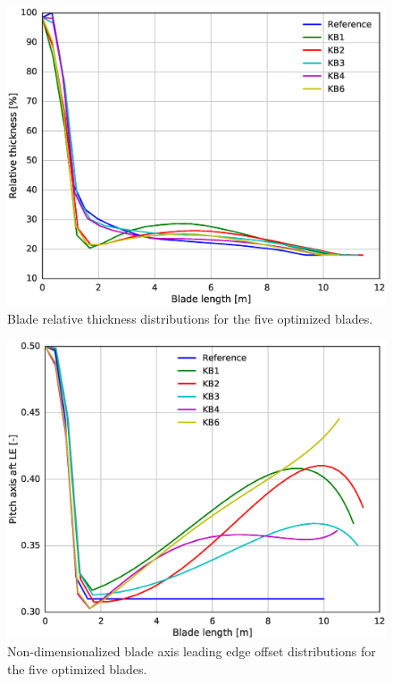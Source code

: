 \begin{figure}[!ht]
\begin{center}
	\includegraphics[width=.85\linewidth]{figures/KBcomp_rthick.eps}
\end{center}
\caption{Blade relative thickness distributions for the five optimized blades.}
\label{fig:rthick}
\end{figure}


\begin{figure}[!ht]
\begin{center}
	\includegraphics[width=.85\linewidth]{figures/KBcomp_ple.eps}
\end{center}
\caption{Non-dimensionalized blade axis leading edge offset distributions for the five optimized blades.}
\label{fig:p_le}
\end{figure}


